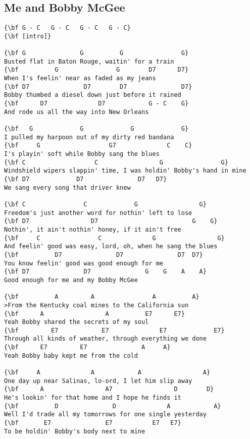 \documentclass[a4paper]{article}
\begin{document}
\subsection{Me and Bobby McGee} %
\label{sub:Me and Bobby McGee}
\begin{Verbatim}[commandchars=\\\{\}]
{\bf G - C   G - C   G - C   G - C}
{\bf [intro]}

{\bf G               G          G                G}
Busted flat in Baton Rouge, waitin' for a train
{\bf          G                G        D7      D7}
When I's feelin' near as faded as my jeans
{\bf D7               D7        D7               D7}
Bobby thumbed a diesel down just before it rained
{\bf      D7              D7            G - C    G}
And rode us all the way into New Orleans

{\bf   G             G             G             G}
I pulled my harpoon out of my dirty red bandana
{\bf     G                   G7              C    C}
I's playin' soft while Bobby sang the blues
{\bf C                   C                 G                G}
Windshield wipers slappin' time, I was holdin' Bobby's hand in mine
{\bf D7             D7               D7   D7}
We sang every song that driver knew

{\bf C                C             G                 G}
Freedom's just another word for nothin' left to lose
{\bf D7                 D7                          G    G}
Nothin', it ain't nothin' honey, if it ain't free
{\bf     C                C              G                 G}
And feelin' good was easy, lord, oh, when he sang the blues
{\bf          D7               D7               D7  D7}
You know feelin' good was good enough for me
{\bf D7               D7               G    G    A    A}
Good enough for me and my Bobby McGee

{\bf          A         A                A          A}
>From the Kentucky coal mines to the California sun
{\bf      A                 A          E7      E7}
Yeah Bobby shared the secrets of my soul
{\bf         E7            E7              E7             E7}
Through all kinds of weather, through everything we done
{\bf      E7         E7               A     A}
Yeah Bobby baby kept me from the cold

{\bf     A              A            A                 A}
One day up near Salinas, lo-ord, I let him slip away
{\bf      A                 A7                 D        D}
He's lookin' for that home and I hope he finds it
{\bf          D               D              A            A}
Well I'd trade all my tomorrows for one single yesterday
{\bf       E7               E7           E7   E7}
To be holdin' Bobby's body next to mine


\end{Verbatim}
\end{document}
